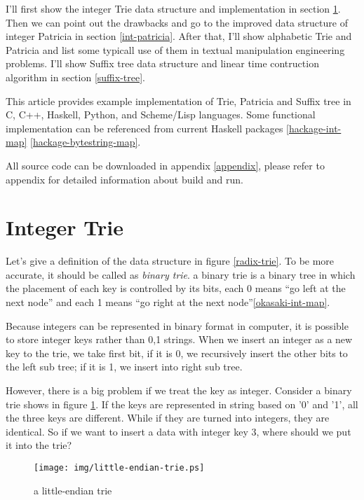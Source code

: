 \documentclass{article}
\begin{document}
I'll first show the integer Trie data structure and implementation in
section \ref{int-trie}. Then we can point out the drawbacks and go to
the improved data structure of integer Patricia in
section \ref{int-patricia}.
After that, I'll show alphabetic Trie and Patricia and list some
typicall use of them in textual manipulation engineering problems.
I'll show Suffix tree data structure and linear time contruction
algorithm in section \ref{suffix-tree}.

This article provides example implementation of Trie, Patricia and Suffix tree
in C, C++, Haskell, Python, and Scheme/Lisp languages. Some functional
implementation can be referenced from current Haskell packages \ref{hackage-int-map} 
\ref{hackage-bytestring-map}.

All source code can be downloaded in appendix \ref{appendix}, please 
refer to appendix for detailed information about build and run.

\section{Integer Trie}
\label{int-trie}

Let's give a definition of the data structure in figure \ref{radix-trie}.
To be more accurate, it should be called as \emph{binary trie}. a binary
trie is a binary tree in which the placement of each key is controlled by
its bits, each 0 means ``go left at the next node'' and each 1 means ``go
right at the next node''\ref{okasaki-int-map}.

Because integers can be represented in binary format in computer, it is 
possible to store integer keys rather than 0,1 strings. When we insert an
integer as a new key to the trie, we take first bit, if it is 0, we recursively
insert the other bits to the left sub tree; if it is 1, we insert into right
sub tree.

However, there is a big problem if we treat the key as integer. Consider a binary
trie shows in figure \ref{fig:little-endian-trie}. If the keys are represented in 
string based on '0' and '1', all the three keys are different. While if they are
turned into integers, they are identical. So if we want to insert a data with integer
key 3, where should we put it into the trie?

\begin{figure}[htbp]
       \begin{center}
	\texttt{[image: img/little-endian-trie.ps]}
        \caption{a little-endian trie} \label{fig:little-endian-trie}
       \end{center}
\end{figure}
\end{document}
